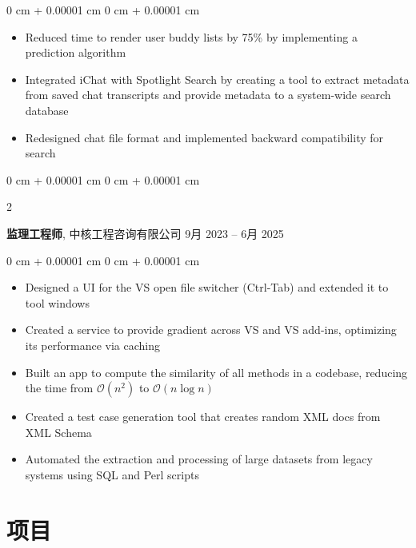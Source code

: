 \documentclass[10pt, letterpaper]{article}
\newenvironment{highlights}{
    \begin{itemize}[
        topsep=0.10 cm,
        parsep=0.10 cm,
        partopsep=0pt,
        itemsep=0pt,
        leftmargin=0 cm + 10pt
    ]
}{
    \end{itemize}
} %
\newenvironment{onecolentry}{
    \begin{adjustwidth}{
        0 cm + 0.00001 cm
    }{
        0 cm + 0.00001 cm
    }
}{
    \end{adjustwidth}
} %
\newenvironment{twocolentry}[2][]{
    \onecolentry
    \def\secondColumn{#2}
    \setcolumnwidth{\fill, 4.5 cm}
    \begin{paracol}{2}
}{
    \switchcolumn \raggedleft \secondColumn
    \end{paracol}
    \endonecolentry
} %
\begin{document}
        \vspace{0.10 cm}
        \begin{onecolentry}
            \begin{highlights}
                \item Reduced time to render user buddy lists by 75\% by implementing a prediction algorithm
                \item Integrated iChat with Spotlight Search by creating a tool to extract metadata from saved chat transcripts and provide metadata to a system-wide search database
                \item Redesigned chat file format and implemented backward compatibility for search
            \end{highlights}
        \end{onecolentry}


        \vspace{0.2 cm}

        \begin{twocolentry}{
            9月 2023 – 6月 2025
        }
            \textbf{监理工程师}, 中核工程咨询有限公司\end{twocolentry}

        \vspace{0.10 cm}
        \begin{onecolentry}
            \begin{highlights}
                \item Designed a UI for the VS open file switcher (Ctrl-Tab) and extended it to tool windows
                \item Created a service to provide gradient across VS and VS add-ins, optimizing its performance via caching
                \item Built an app to compute the similarity of all methods in a codebase, reducing the time from $\mathcal{O}(n^2)$ to $\mathcal{O}(n \log n)$
                \item Created a test case generation tool that creates random XML docs from XML Schema
                \item Automated the extraction and processing of large datasets from legacy systems using SQL and Perl scripts
            \end{highlights}
        \end{onecolentry}



    
 
    
    \section{项目}
\end{document}
